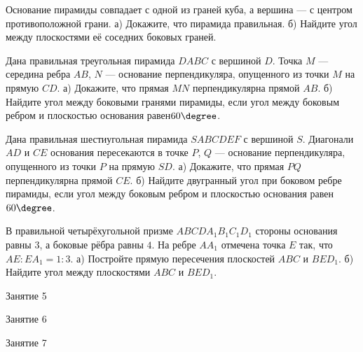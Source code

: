 \begin{class}[number=4]
	\begin{listofex}
		\item Основание пирамиды совпадает с одной из граней куба, а вершина --- с центром противоположной грани. а) Докажите, что пирамида правильная. б) Найдите угол между плоскостями её соседних боковых граней.
		\item Дана правильная треугольная пирамида \(DABC\) с вершиной \(D\). Точка \(M\) --- середина ребра \(AB\), \(N\) --- основание перпендикуляра, опущенного из точки \(M\) на прямую \(CD\). а) Докажите, что прямая \(MN\) перпендикулярна прямой \(AB\). б) Найдите угол между боковыми гранями пирамиды, если угол между боковым ребром и плоскостью основания равен\( 60 \degree \).
		\item Дана правильная шестиугольная пирамида \(SABCDEF\) с вершиной \(S\). Диагонали \(AD\) и \(CE\) основания пересекаются в точке \(P\), \(Q\) — основание перпендикуляра, опущенного из точки \(P\) на прямую \(SD\). а) Докажите, что прямая \(PQ\) перпендикулярна прямой \(CE\). б) Найдите двугранный угол при боковом ребре пирамиды, если угол между боковым ребром и плоскостью основания равен \(60 \degree \).
		\item В правильной четырёхугольной призме \(ABCDA_1B_1C_1D_1\) стороны основания равны \(3\), а боковые рёбра равны \(4\). На ребре \(AA_1\) отмечена точка \(E\) так, что \(AE :EA_1 = 1:3\). а) Постройте прямую пересечения плоскостей \(ABC\) и \(BED_1\). б) Найдите угол между плоскостями \(ABC\) и \(BED_1\).
	\end{listofex}
\end{class}

\begin{class}[number=5]
	\begin{listofex}
		\item Занятие 5
	\end{listofex}
\end{class}

\begin{class}[number=6]
	\begin{listofex}
		\item Занятие 6
	\end{listofex}
\end{class}

\begin{class}[number=7]
	\begin{listofex}
		\item Занятие 7
	\end{listofex}
\end{class}

